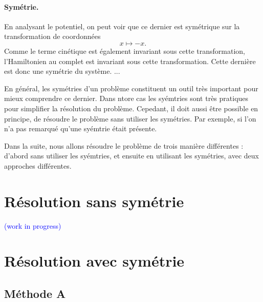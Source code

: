 \documentclass[11pt,a4paper,oneside]{article}
\begin{document}
\paragraph*{Symétrie.} En analysant le potentiel, on peut voir que ce dernier est symétrique sur la transformation de coordonnées
\begin{equation}
    x\mapsto-x.
\end{equation}
Comme le terme cinétique est également invariant sous cette transformation, l'Hamiltonien au complet est invariant sous cette transformation. Cette dernière est donc une symétrie du système.
... 

En général, les symétries d'un problème constituent un outil très important pour mieux comprendre ce dernier. Dans ntore cas les syémtries sont très pratiques pour simplifier la résolution du problème. Cepedant, il doit aussi être possible en principe, de résoudre le problème sans utiliser les symétries. Par exemple, si l'on n'a pas remarqué qu'une syémtrie était présente.

Dans la suite, nous allons résoudre le problème de trois manière différentes : d'abord sans utiliser les syémtries, et ensuite en utilisant les symétries, avec deux approches différentes.

\section{Résolution sans symétrie}

\textcolor{blue}{(work in progress)}

\section{Résolution avec symétrie}

\subsection{Méthode A}
\end{document}
